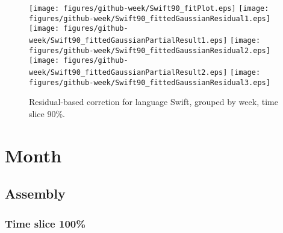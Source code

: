 \begin{figure}[hb]
\centering
{}
{\texttt{[image: figures/github-week/Swift90\_fitPlot.eps]}}
{\texttt{[image: figures/github-week/Swift90\_fittedGaussianResidual1.eps]}}
{\texttt{[image: figures/github-week/Swift90\_fittedGaussianPartialResult1.eps]}}
{\texttt{[image: figures/github-week/Swift90\_fittedGaussianResidual2.eps]}}
{\texttt{[image: figures/github-week/Swift90\_fittedGaussianPartialResult2.eps]}}
{\texttt{[image: figures/github-week/Swift90\_fittedGaussianResidual3.eps]}}
\caption{Residual-based corretion for language Swift, grouped by week, time slice 90\%.}
\end{figure}


\clearpage 
\newpage 


\section{Month}

\subsection{Assembly}

\FloatBarrier

\subsubsection{Time slice 100\%}

